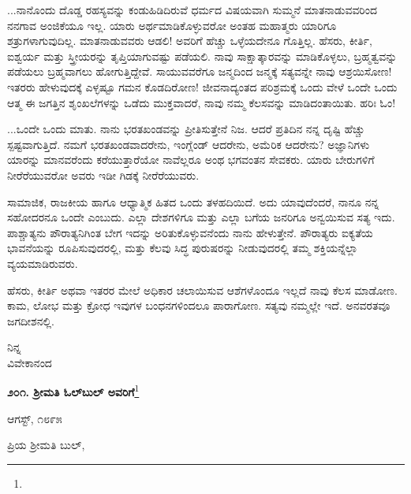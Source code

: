 ...ನಾನೊಂದು ದೊಡ್ಡ ರಹಸ್ಯವನ್ನು ಕಂಡುಹಿಡಿದಿರುವೆ\enginline{-} ಧರ್ಮದ ವಿಷಯವಾಗಿ ಸುಮ್ಮನೆ ಮಾತನಾಡುವವರಿಂದ ನನಗಾವ ಅಂಜಿಕೆಯೂ ಇಲ್ಲ. ಯಾರು ಅರ್ಥಮಾಡಿಕೊಳ್ಳುವರೋ ಅಂತಹ ಮಹಾತ್ಮರು ಯಾರಿಗೂ ಶತ್ರುಗಳಾಗುವುದಿಲ್ಲ. ಮಾತನಾಡುವವರು ಆಡಲಿ! ಅವರಿಗೆ ಹೆಚ್ಚು ಒಳ್ಳೆಯದೇನೂ ಗೊತ್ತಿಲ್ಲ. ಹೆಸರು, ಕೀರ್ತಿ, ಐಶ್ವರ್ಯ ಮತ್ತು ಸ್ತ್ರೀಯರನ್ನು ತೃಪ್ತಿಯಾಗುವಷ್ಟು ಪಡೆಯಲಿ. ನಾವು ಸಾಕ್ಷಾತ್ಕಾರವನ್ನು ಮಾಡಿಕೊಳ್ಳಲು, ಬ್ರಹ್ಮತ್ವವನ್ನು ಪಡೆಯಲು ಬ್ರಹ್ಮವಾಗಲು ಹೋಗುತ್ತಿದ್ದೇವೆ. ಸಾಯುವವರೆಗೂ ಜನ್ಮದಿಂದ ಜನ್ಮಕ್ಕೆ ಸತ್ಯವನ್ನೇ ನಾವು ಆಶ್ರಯಿಸೋಣ! ಇತರರು ಹೇಳುವುದಕ್ಕೆ ಎಳ್ಳಷ್ಟೂ ಗಮನ ಕೊಡದಿರೋಣ! ಜೀವನಾದ್ಯಂತದ ಪರಿಶ್ರಮಕ್ಕೆ ಒಂದು 
ವೇಳೆ ಒಂದೇ ಒಂದು ಆತ್ಮ ಈ ಜಗತ್ತಿನ ಶೃಂಖಲೆಗಳನ್ನು ಒಡೆದು ಮುಕ್ತವಾದರೆ, ನಾವು ನಮ್ಮ ಕೆಲಸವನ್ನು ಮಾಡಿದಂತಾಯಿತು. ಹರಿಃ ಓಂ!

\vspace{0.15cm}

...ಒಂದೇ ಒಂದು ಮಾತು. ನಾನು ಭರತಖಂಡವನ್ನು ಪ್ರೀತಿಸುತ್ತೇನೆ ನಿಜ. ಆದರೆ ಪ್ರತಿದಿನ ನನ್ನ ದೃಷ್ಟಿ ಹೆಚ್ಚು ಸ್ಪಷ್ಟವಾಗುತ್ತಿದೆ. ನಮಗೆ ಭರತಖಂಡವಾದರೇನು, ಇಂಗ್ಲೆಂಡ್ ಆದರೇನು, ಅಮೆರಿಕ ಆದರೇನು? ಅಜ್ಞಾನಿಗಳು ಯಾರನ್ನು ಮಾನವರೆಂದು ಕರೆಯುತ್ತಾರೆಯೋ ನಾವೆಲ್ಲರೂ ಅಂಥ ಭಗವಂತನ ಸೇವಕರು. ಯಾರು ಬೇರುಗಳಿಗೆ ನೀರೆರೆಯುವರೋ ಅವರು ಇಡೀ ಗಿಡಕ್ಕೆ ನೀರೆರೆಯುವರು.

\vspace{0.15cm}

ಸಾಮಾಜಿಕ, ರಾಜಕೀಯ ಹಾಗೂ ಆಧ್ಯಾತ್ಮಿಕ ಹಿತದ ಒಂದು ತಳಹದಿಯಿದೆ. ಅದು ಯಾವುದೆಂದರೆ, ನಾನೂ ನನ್ನ ಸಹೋದರನೂ ಒಂದೇ ಎಂಬುದು. ಎಲ್ಲಾ ದೇಶಗಳಿಗೂ ಮತ್ತು ಎಲ್ಲಾ ಬಗೆಯ ಜನರಿಗೂ ಅನ್ವಯಿಸುವ ಸತ್ಯ ಇದು. ಪಾಶ್ಚಾತ್ಯನು ಪೌರಾತ್ಯನಿಗಿಂತ ಬೇಗ ಇದನ್ನು ಅರಿತುಕೊಳ್ಳುವನೆಂದು ನಾನು ಹೇಳುತ್ತೇನೆ. ಪೌರಾತ್ಯರು ಐಕ್ಯತೆಯ ಭಾವನೆಯನ್ನು ರೂಪಿಸುವುದರಲ್ಲಿ, ಮತ್ತು ಕೆಲವು ಸಿದ್ಧ ಪುರುಷರನ್ನು ನೀಡುವುದರಲ್ಲಿ ತಮ್ಮ ಶಕ್ತಿಯನ್ನೆಲ್ಲಾ ವ್ಯಯಮಾಡಿರುವರು.

\vspace{0.15cm}

ಹೆಸರು, ಕೀರ್ತಿ ಅಥವಾ ಇತರರ ಮೇಲೆ ಅಧಿಕಾರ ಚಲಾಯಿಸುವ ಆಶೆಗಳೊಂದೂ ಇಲ್ಲದೆ ನಾವು ಕೆಲಸ ಮಾಡೋಣ. ಕಾಮ, ಲೋಭ ಮತ್ತು ಕ್ರೋಧ ಇವುಗಳ ಬಂಧನಗಳಿಂದಲೂ ಪಾರಾಗೋಣ. ಸತ್ಯವು ನಮ್ಮಲ್ಲೇ ಇದೆ. ಅನವರತವೂ ಜಗದೀಶನಲ್ಲಿ.

{\flushright
ನಿನ್ನ\\ವಿವೇಕಾನಂದ\par}

\newpage

\begin{center}
\textbf{೨೦೧. ಶ‍್ರೀಮತಿ ಓಲ್‌ಬುಲ್‌ ಅವರಿಗೆ}\footnote{}
\end{center}

\begin{flushright}
ಆಗಸ್ಟ್, ೧೮೯೫
\end{flushright}

\noindent
ಪ್ರಿಯ ಶ‍್ರೀಮತಿ ಬುಲ್,

\vspace{0.15cm}

